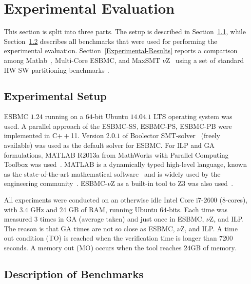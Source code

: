 \section{Experimental Evaluation}
\label{Experimental-Evaluation}

This section is split into three parts. The setup is described in Section~\ref{Experimental-Setup}, while Section~\ref{Benchmarks-Description} describes all benchmarks that were used for performing the experimental evaluation. Section~\ref{Experimental-Results} reports a comparison among Matlab~\cite{TheMathWorks2013}, Multi-Core ESBMC, and MaxSMT $\nu$Z~\cite{Bjorner2015} using a set of standard HW-SW partitioning benchmarks~\cite{Mann2007}.

\subsection{Experimental Setup}
\label{Experimental-Setup}

ESBMC $1$.$24$ running on a $64$-bit Ubuntu $14$.$04$.$1$ LTS operating system was used. A parallel approach of the ESBMC-SS, ESBMC-PS, ESBMC-PB were implemented in C$++$11. Version $2$.$0$.$1$ of Boolector SMT-solver~\cite{Brummayer2009} (freely available) was used as the default solver for ESBMC. For ILP and GA formulations, MATLAB R$2013$a from MathWorks with Parallel Computing Toolbox was used~\cite{TheMathWorks2013}. MATLAB is a dynamically typed high-level language, known as the state-of-the-art mathematical software~\cite{Tranquillo2011} and is widely used by the engineering community~\cite{Hong2010}. ESBMC-$\nu$Z as a built-in tool to Z3 was also used~\cite{Bjorner2014}. 

All experiments were conducted on an otherwise idle Intel Core i$7$-$2600$ ($8$-cores), with $3$.$4$ GHz and $24$ GB of RAM, running Ubuntu $64$-bits. Each time was measured $3$ times in GA (average taken) and just once in ESBMC, $\nu$Z, and ILP. The reason is that GA times are not so close as ESBMC, $\nu$Z, and ILP. A time out condition (TO) is reached when the verification time is longer than $7200$ seconds. A memory out (MO) occurs when the tool reaches $24$GB of memory. 

\subsection{Description of Benchmarks}
\label{Benchmarks-Description}

